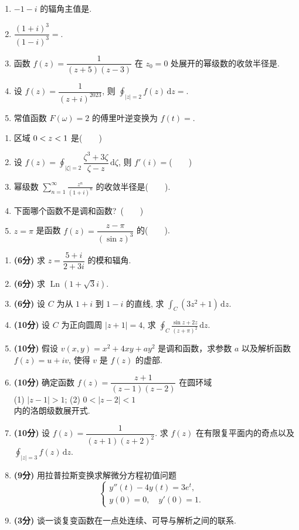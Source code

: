 \documentclass[simple]{hfutexam}
\DeclareMathOperator{\Ln}{Ln}
\newcommand{\diff}{\,\mathrm{d}}
\let\Re\relax\DeclareMathOperator{\Re}{Re}
\begin{document}
\begin{enumerate}
\item $-1-i$ 的辐角主值是\fillblank{}.
\item $\dfrac{(1+i)^3}{(1-i)^3}=$\fillblank{}.
\item 函数 $f(z)=\dfrac1{(z+5)(z-3)}$ 在 $z_0=0$ 处展开的幂级数的收敛半径是\fillblank{}.
\item 设 $f(z)=\dfrac1{(z+i)^{2023}}$, 则 $\displaystyle\oint_{|z|=2}f(z)\diff z=$\fillblank{}.
\item 常值函数 $F(\omega)=2$ 的傅里叶逆变换为 $f(t)=$\fillblank{}.
\end{enumerate}

\begin{enumerate}
\item 区域 $0<\Re z<1$ 是(~~~~)
\item 设 $f(z)=\displaystyle\oint_{|\zeta|=2}\dfrac{\zeta^3+3\zeta}{\zeta-z}\diff\zeta$, 则 $f'(i)=$(~~~~)
\item 幂级数 $\displaystyle\sum_{n=1}^\infty \frac{z^n}{(1+i)^n}$ 的收敛半径是(~~~~).
\item 下面哪个函数不是调和函数?~(~~~~)
\item $z=\pi$ 是函数 $f(z)=\dfrac{z-\pi}{(\sin z)^3}$ 的(~~~~).
\end{enumerate}


\begin{enumerate}
\item \textbf{(6分)} 求 $z=\dfrac{5+i}{2+3i}$ 的模和辐角.
\item \textbf{(6分)} 求 $\Ln(1+\sqrt3i)$.
\item \textbf{(6分)} 设 $C$ 为从 $1+i$ 到 $1-i$ 的直线, 求 $\displaystyle\int_C (3z^2+1) \diff z$.
\item \textbf{(10分)} 设 $C$ 为正向圆周 $|z+1|=4$, 求 $\displaystyle\oint_C\frac{\sin z+2z}{(z+\pi)^2}\diff z$.
\item \textbf{(10分)} 假设 $v(x,y)=x^2+4xy+ay^2$ 是调和函数，求参数 $a$ 以及解析函数 $f(z)=u+iv$, 使得 $v$ 是 $f(z)$ 的虚部.
\item \textbf{(10分)} 确定函数 $f(z)=\dfrac{z+1}{(z-1)(z-2)}$ 在圆环域\\
\indent (1) $|z-1|>1$; \hspace{2em} (2) $0<|z-2|<1$\\
内的洛朗级数展开式.
\item \textbf{(10分)} 设 $f(z)=\dfrac{1}{(z+1)(z+2)^2}$. 求 $f(z)$ 在有限复平面内的奇点以及 $\displaystyle\oint_{|z|=3}f(z)\diff z$.
\item \textbf{(9分)} 用拉普拉斯变换求解微分方程初值问题
\[\begin{cases}
y''(t)-4y(t)=3e^t,&\\
y(0)=0,\quad y'(0)=1.
\end{cases}\]
\item \textbf{(3分)} 谈一谈复变函数在一点处连续、可导与解析之间的联系.
\end{enumerate}
\end{document}
